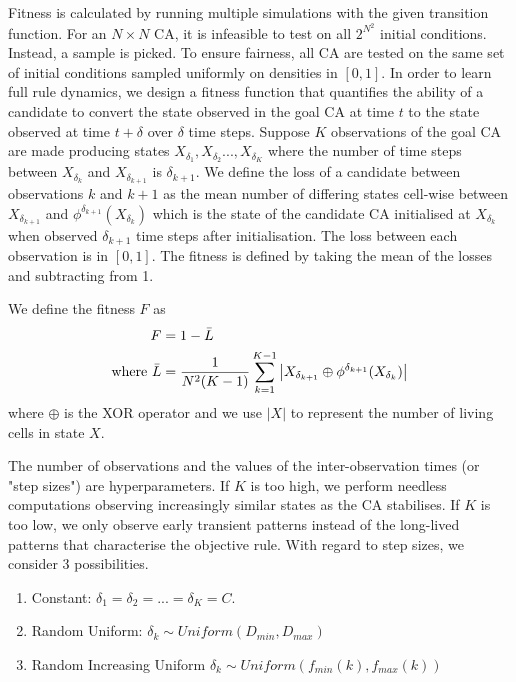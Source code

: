 Fitness is calculated by running multiple simulations with the given transition function. For an $N \times N$ CA, it is infeasible to test on all $2^{N^2}$ initial conditions. Instead, a sample is picked. To ensure fairness, all CA are tested on the same set of initial conditions sampled uniformly on densities in $[0, 1]$. In order to learn full rule dynamics, we design a fitness function that quantifies the ability of a candidate to convert the state observed in the goal CA at time $t$ to the state observed at time $t+\delta$ over $\delta$ time steps. Suppose $K$ observations of the goal CA are made producing states $X_{\delta_1}, X_{\delta_2} ..., X_{\delta_K}$ where the number of time steps between $X_{\delta_k}$ and $X_{\delta_{k+1}}$ is $\delta_{k+1}$. We define the loss of a candidate between observations $k$ and $k+1$ as the mean number of differing states cell-wise between $X_{\delta_{k+1}}$ and $\phi^{\delta_{k+1}}(X_{\delta_k})$ which is the state of the candidate CA initialised at $X_{\delta_k}$ when observed $\delta_{k+1}$ time steps after initialisation. The loss between each observation is in $[0 ,1]$. The fitness is defined by taking the mean of the losses and subtracting from 1.

\begin{definition}
We define the fitness $F$ as
\begin{align}
    F &= 1 - \bar{L}\\
    \textnormal{where\ } \bar{L} &= \frac{1}{N^2(K-1)}\sum_{k=1}^{K-1} \left| X_{\delta_{k+1}} \oplus \phi^{\delta_{k+1}}(X_{\delta_k}) \right|
\end{align}
where $\oplus$ is the XOR operator and we use $|X|$ to represent the number of living cells in state $X$.
\end{definition}

The number of observations and the values of the inter-observation times (or "step sizes") are hyperparameters. If $K$ is too high, we perform needless computations observing increasingly similar states as the CA stabilises. If $K$ is too low, we only observe early transient patterns instead of the long-lived patterns that characterise the objective rule. With regard to step sizes, we consider 3 possibilities.

\begin{enumerate}
    \item Constant: $\delta_1 = \delta_2 = ... = \delta_K = C$.
    \item Random Uniform: $\delta_k \sim \mathit{Uniform}(D_{min}, D_{max})$
    \item Random Increasing Uniform $\delta_k \sim \mathit{Uniform}(f_{min}(k), f_{max}(k))$
\end{enumerate}

